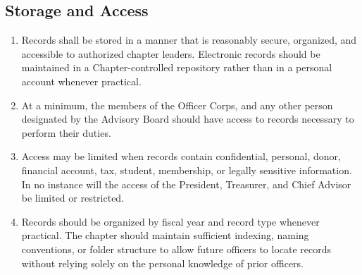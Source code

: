 \subsection{Storage and Access} \label{XII.9}
\begin{enumerate}
    \item {} Records shall be stored in a manner that is reasonably secure, organized, and accessible to authorized chapter leaders. 
    Electronic records should be maintained in a Chapter-controlled repository rather than in a personal account whenever practical.
    \item {} At a minimum, the members of the Officer Corps, and any other person designated by the Advisory Board should have access to records necessary 
    to perform their duties.
    \item {} Access may be limited when records contain confidential, personal, donor, financial account, tax, student, membership, or legally sensitive information. 
    In no instance will the access of the President, Treasurer, and Chief Advisor be limited or restricted.
    \item {} Records should be organized by fiscal year and record type whenever practical. The chapter should maintain sufficient indexing, naming conventions, 
    or folder structure to allow future officers to locate records without relying solely on the personal knowledge of prior officers.
\end{enumerate}

